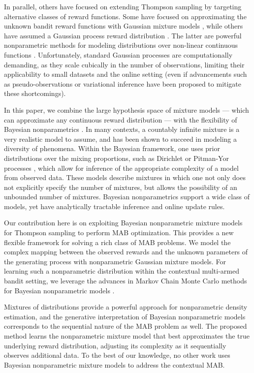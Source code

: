 \documentclass{article}
\begin{document}
In parallel, others have focused on extending Thompson sampling by targeting alternative classes of reward functions. Some have focused on approximating the unknown bandit reward functions with Gaussian mixture models \cite{ip-Urteaga2018}, while others have assumed a Gaussian process reward distribution \cite{ip-Srinivas2010,ip-Gruenewaelder2010,ic-Krause2011}. The latter are powerful nonparametric methods for modeling distributions over non-linear continuous functions \cite{b-Rasmussen2005}. Unfortunately, standard Gaussian processes are computationally demanding, as they scale cubically in the number of observations, limiting their applicability to small datasets and the online setting (even if advancements such as pseudo-observations \cite{ic-Snelson2006} or variational inference \cite{ip-Titsias2009} have been proposed to mitigate these shortcomings).

In this paper, we combine the large hypothesis space of mixture models --- which can approximate any continuous reward distribution --- with the flexibility of Bayesian nonparametrics \cite{j-Gershman2012}. In many contexts, a countably infinite mixture is a very realistic model to assume, and has been shown to succeed in modeling a diversity of phenomena. Within the Bayesian framework, one uses prior distributions over the mixing proportions, such as Dirichlet or Pitman-Yor processes \cite{j-Teh2010}, which allow for inference of the appropriate complexity of a model from observed data. These models describe mixtures in which one not only does not explicitly specify the number of mixtures, but allows the possibility of an unbounded number of mixtures. Bayesian nonparametrics support a wide class of models, yet have analytically tractable inference and online update rules.

Our contribution here is on exploiting Bayesian nonparametric mixture models for Thompson sampling to perform MAB optimization. 
This provides a new flexible framework for solving a rich class of MAB problems. We model the complex mapping between the observed rewards and the unknown parameters of the generating process with nonparametric Gaussian mixture models. For learning such a nonparametric distribution within the contextual multi-armed bandit setting, we leverage the advances in Markov Chain Monte Carlo methods for Bayesian nonparametric models \cite{j-Neal2000}.

Mixtures of distributions provide a powerful approach for nonparametric density estimation, and the generative interpretation of Bayesian nonparametric models corresponds to the sequential nature of the MAB problem as well. The proposed method learns the nonparametric mixture model that best approximates the true underlying reward distribution, adjusting its complexity as it sequentially observes additional data. To the best of our knowledge, no other work uses Bayesian nonparametric mixture models to address the contextual MAB.
\end{document}
